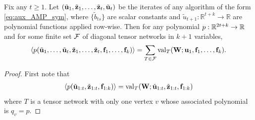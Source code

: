 \documentclass[10pt,reqno]{amsart}
\def\R{\mathbb{R}}
\def\val{\operatorname{val}}
\def\bW{{\mathbf{W}}}
\begin{document}
\begin{lemma}\label{lemma:polynomial_tensor_network_decomposition}
Fix any $t \geq 1$.
Let $(\tilde{\mathbf{u}}_1, \tilde{\mathbf{z}}_1, \ldots, \tilde{\mathbf{z}}_t, 
\tilde{\mathbf{u}}_t)$ be the iterates of any algorithm of the
form \eqref{eq:aux_AMP_sym}, where $\{\tilde{b}_{ts}\}$ are scalar constants and
$\tilde{u}_{t+1}:\R^{t+k} \to \R$ are polynomial functions applied row-wise.
Then for any polynomial $p: \mathbb{R}^{2t+k} \to \mathbb{R}$ and for some finite set $\mathcal{F}$ of
diagonal tensor networks in $k+1$ variables,
\begin{align*}
\langle p(\tilde\ub_1, \ldots, \tilde\ub_t,\tilde\zb_1, \ldots, \tilde\zb_t,
\fb_1, \ldots, \fb_k) \rangle 
= \sum_{T \in \cF} \val_T(\bW; \ub_1, \fb_1, \ldots, \fb_k). 
\end{align*} 
\end{lemma}
\begin{proof}
First note that 
\begin{align*}
\langle p(\tilde\ub_{1:t}, \tilde\zb_{1:t},\fb_{1:k}) \rangle 
= \val_T(\bW; \tilde\ub_{1:t}, \tilde\zb_{1:t}, \fb_{1:k})
\end{align*}
where $T$ is a tensor network with only one vertex $v$ whose associated 
polynomial is $q_v = p$.


\end{proof}
\end{document}
